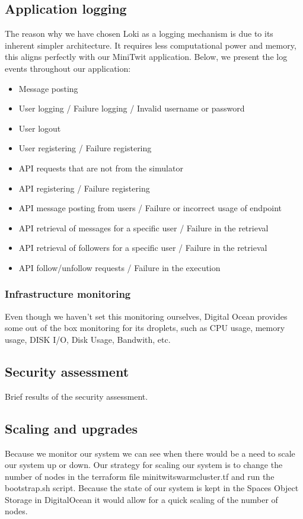 \subsection{Application logging}
The reason why we have chosen Loki as a logging mechanism is due to its inherent simpler architecture. It requires less computational power and memory, this aligns perfectly with our MiniTwit application.
Below, we present the log events throughout our application:
\begin{itemize}
    \item Message posting
    \item User logging / Failure logging / Invalid username or password
    \item User logout
    \item User registering / Failure registering
    \item API requests that are not from the simulator
    \item API registering / Failure registering
    \item API message posting from users / Failure or incorrect usage of endpoint
    \item API retrieval of messages for a specific user / Failure in the retrieval
    \item API retrieval of followers for a specific user / Failure in the retrieval
    \item API follow/unfollow requests / Failure in the execution
    
\end{itemize}

\subsubsection{Infrastructure monitoring}
Even though we haven't set this monitoring ourselves, Digital Ocean provides some out of the box monitoring for its droplets, such as CPU usage, memory usage, DISK I/O, Disk Usage, Bandwith, etc.

\subsection{Security assessment}
Brief results of the security assessment.


\subsection{Scaling and upgrades}
Because we monitor our system we can see when there would be a need to scale our system up or down. Our strategy for scaling our system is to change the number of nodes in the terraform file minitwit\textunderscore swarm\textunderscore cluster.tf and run the bootstrap.sh script. Because the state of our system is kept in the Spaces Object Storage in DigitalOcean it would allow for a quick scaling of the number of nodes. 
